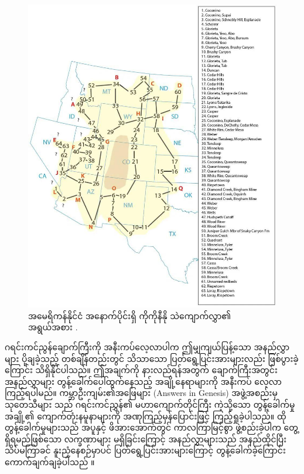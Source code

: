 \documentclass[10pt,twocolumn,letterpaper]{article}
\begin{document}
\begin{figure}[t]
\begin{center}
   \includegraphics[width=1\linewidth]{coconino.jpg}
\end{center}
   \caption{အမေရိကန်နိုင်ငံ အနောက်ပိုင်းရှိ ကိုကိုနီနို သဲကျောက်လွှာ၏ အရွယ်အစား \cite{21}.}
\label{fig:3}
\label{fig:onecol}
\end{figure}

ဂရင်းကင်ညွန်ချောက်ကြီးကို အနီးကပ်လေ့လာပါက ဤမျှကျယ်ပြန့်သော အနည်လွှာများ ပို့ချခဲ့သည့် တစ်ချိန်တည်းတွင် သိသာသော ပြတ်ရွေ့ပြင်းအားများလည်း ဖြစ်ပွားခဲ့ကြောင်း သိရှိနိုင်ပါသည်။ ဤအချက်ကို နားလည်ရန်အတွက် ချောက်ကြီးအတွင်း အနည်လွှာများ တွန့်ခေါက်ပေါ်ထွက်နေသည့် အချို့နေရာများကို အနီးကပ် လေ့လာကြည့်ရပါမည်။ ကမ္ဘာဦးကျမ်း၏အဖြေများ (Answers in Genesis) အဖွဲ့အစည်းမှ သုတေသီများ \cite{42} သည် ဂရင်းကင်ညွှန်၏ မဟာကျောက်တိုင်ကြီး ကဲ့သို့သော တွန့်ခေါက်မှုအချို့၏ ကျောက်တုံးနမူနာများကို အဏုကြည့်မှန်ပြောင်းဖြင့် ကြည့်ရှုခဲ့ပါသည်။ ထိုတွန့်ခေါက်မှုများသည် အပူနှင့် ဖိအားအောက်တွင် ကာလကြာမြင့်စွာ ဖွဲ့စည်းခဲ့ပါက တွေ့ရှိရမည်ဖြစ်သော လက္ခဏာများ မရှိခြင်းကြောင့် အနည်လွှာများသည် အနည်ထိုင်ပြီး သိပ်မကြာခင် နူးညံ့နေစဉ်မှာပင် ပြတ်ရွေ့ပြင်းအားများကြောင့် တွန့်ခေါက်ခဲ့ကြောင်း ကောက်ချက်ချခဲ့ပါသည် \cite{43}။
\end{document}
